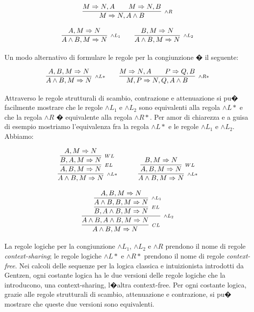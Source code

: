 \documentclass[a4paper,12pt]{aphex}
\begin{document}
$$\infer[_{\wedge R}]{M\Rightarrow N, A\wedge B}{M\Rightarrow N, A \qquad M\Rightarrow N, B}$$

$$\infer[_{\wedge L_{1}}]{A\wedge B, M\Rightarrow N}{A, M\Rightarrow N}\qquad\infer[_{\wedge L_{2}}]{A\wedge B, M\Rightarrow N}{B, M\Rightarrow N}$$

\vspace{0.2cm}


\noindent Un modo alternativo di formulare le regole per la congiunzione � il seguente:

$$\infer[_{\wedge L*}]{A\wedge B, M\Rightarrow N}{A, B, M\Rightarrow N}\qquad\infer[_{\wedge R*}]{M, P\Rightarrow N, Q, A\wedge B}{M\Rightarrow N, A \qquad P\Rightarrow Q, B}$$


\vspace{0.2cm}


\noindent Attraverso le regole strutturali di scambio, contrazione e attenuazione si pu� facilmente mostrare che le regole $\wedge L_{1}$ e $\wedge L_{2}$ sono equivalenti alla regola $\wedge L*$ e che la regola $\wedge R$ � equivalente alla regola $\wedge R*$. Per amor di chiarezza e a guisa di esempio mostriamo l'equivalenza fra la regola   $\wedge L*$ e le regole $\wedge L_{1}$ e $\wedge L_{2}$. Abbiamo:

$$\infer[_{\wedge L*}]{A\wedge B, M\Rightarrow N}{\infer[_{EL}]{A, B, M\Rightarrow N}{\infer[_{WL}]{B, A, M\Rightarrow N}{A, M\Rightarrow N}}}\qquad\quad
\infer[_{\wedge L*}]{A\wedge B, M\Rightarrow N}{\infer[_{WL}]{A, B, M\Rightarrow N}{B, M\Rightarrow N}}$$

\vspace{0.2cm}


$$\infer[_{\wedge L_{2}}]{\infer[_{CL}]{A\wedge B, M\Rightarrow N}{A\wedge B, A\wedge B, M\Rightarrow N}}{\infer[_{EL}]{B, A\wedge B, M\Rightarrow N}{\infer[_{\wedge L_{1}}]{A\wedge B, B, M\Rightarrow N}{A, B, M\Rightarrow N}}}$$

\vspace{0.2cm}


La regole logiche per la congiunzione $\wedge L_{1}$, $\wedge L_{2}$ e $\wedge R$ prendono il nome di regole \emph{context-sharing}; le regole logiche $\wedge L*$ e $\wedge R*$ prendono il nome di regole \emph{context-free}. Nei calcoli delle sequenze per la logica classica e intuizionista introdotti da Gentzen, ogni costante logica ha le due versioni delle regole logiche che la introducono, una context-sharing, l�altra context-free. Per ogni costante logica, grazie alle regole strutturali di scambio, attenuazione e contrazione, si pu� mostrare che queste due versioni sono equivalenti. 
\end{document}
